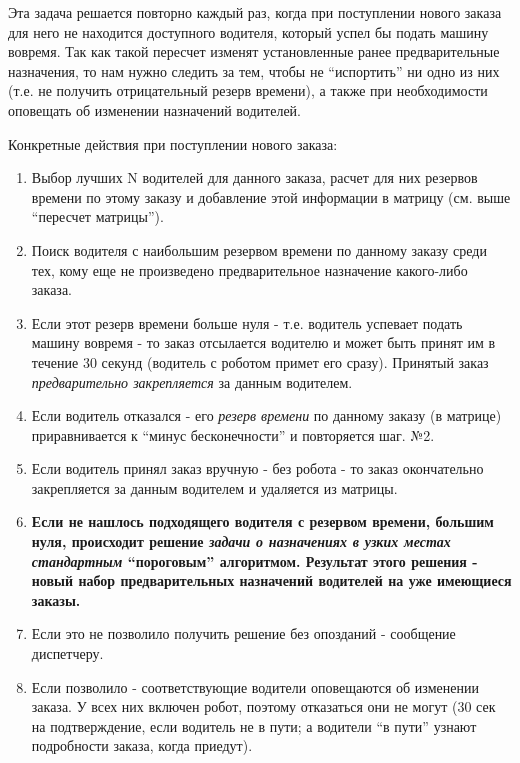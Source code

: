 			Эта задача решается повторно каждый раз, когда при поступлении нового заказа для него не находится доступного водителя, который успел бы подать машину вовремя. Так как такой пересчет изменят установленные ранее предварительные назначения, то нам нужно следить за тем, чтобы не “испортить” ни одно из них (т.е. не получить отрицательный резерв времени), а также при необходимости оповещать об изменении назначений водителей.

			Конкретные действия при поступлении нового заказа:

			\begin{enumerate}
				\item{Выбор лучших N водителей для данного заказа, расчет для них резервов времени по этому заказу и добавление этой информации в матрицу (см. выше “пересчет матрицы”).}

				\item{Поиск водителя с наибольшим резервом времени по данному заказу среди тех, кому еще не произведено предварительное назначение какого-либо заказа.}

				\item{Если этот резерв времени больше нуля - т.е. водитель успевает подать машину вовремя - то заказ отсылается водителю и может быть принят им в течение 30 секунд (водитель с роботом примет его сразу). Принятый заказ \textit{предварительно закрепляется} за данным водителем.}

				\item{Если водитель отказался - его \textit{резерв времени} по данному заказу (в матрице) приравнивается к “минус бесконечности” и повторяется шаг. №2.}

				\item{Если водитель принял заказ вручную - без робота - то заказ окончательно закрепляется за данным водителем и удаляется из матрицы.}

				\item{\textbf{Если не нашлось подходящего водителя с резервом времени, большим нуля, происходит решение \textit{задачи о назначениях в узких местах стандартным} “пороговым” алгоритмом. Результат этого решения - новый набор предварительных назначений водителей на уже имеющиеся заказы.}}

				\item{Если это не позволило получить решение без опозданий - сообщение диспетчеру.}

				\item{Если позволило - соответствующие водители оповещаются об изменении заказа. У всех них включен робот, поэтому отказаться они не могут (30 сек на подтверждение, если водитель не в пути; а водители “в пути” узнают подробности заказа, когда приедут).}


\end{enumerate}
